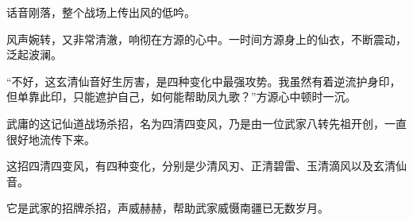\begin{this_body}
话音刚落，整个战场上传出风的低吟。

风声婉转，又非常清澈，响彻在方源的心中。一时间方源身上的仙衣，不断震动，泛起波澜。

“不好，这玄清仙音好生厉害，是四种变化中最强攻势。我虽然有着逆流护身印，但单靠此印，只能遮护自己，如何能帮助凤九歌？”方源心中顿时一沉。

武庸的这记仙道战场杀招，名为四清四变风，乃是由一位武家八转先祖开创，一直很好地流传下来。

这招四清四变风，有四种变化，分别是少清风刃、正清碧雷、玉清滴风以及玄清仙音。

它是武家的招牌杀招，声威赫赫，帮助武家威慑南疆已无数岁月。

\end{this_body}

